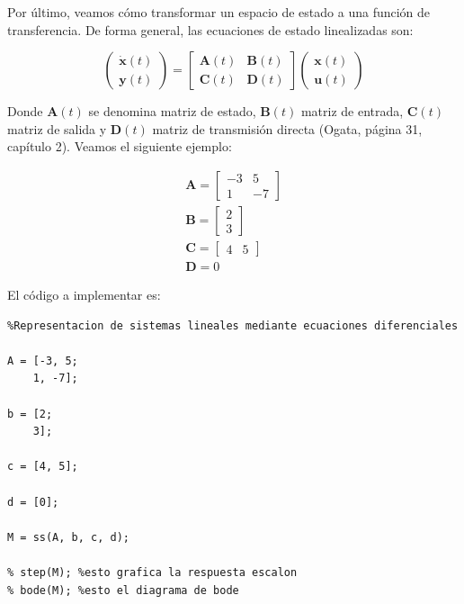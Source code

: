 Por último, veamos cómo transformar un espacio de estado a una función de transferencia. De forma general, las ecuaciones de estado linealizadas son:

\begin{equation}
    \begin{pmatrix}
        \dot{\mathbf{x}}(t) \\
        \mathbf{y}(t)
    \end{pmatrix}
    =
    \begin{bmatrix}
        \mathbf{A}(t) & \mathbf{B}(t) \\
        \mathbf{C}(t) & \mathbf{D}(t)
    \end{bmatrix}
    \begin{pmatrix}
        \mathbf{x}(t)\\
        \mathbf{u}(t)
    \end{pmatrix}
\end{equation}


Donde $\mathbf{A}(t)$ se denomina matriz de estado, $\mathbf{B}(t)$ matriz de entrada, $\mathbf{C}(t)$ matriz de salida y $\mathbf{D}(t)$ matriz de transmisión directa (Ogata, página 31, capítulo 2). Veamos el siguiente ejemplo:

\begin{gather*}
    \mathbf{A} = 
    \begin{bmatrix}
        -3 & 5 \\
        1 & -7
    \end{bmatrix} \\
    \mathbf{B} = 
    \begin{bmatrix}
        2 \\
        3
    \end{bmatrix} \\
    \mathbf{C} = 
    \begin{bmatrix}
        4 & 5
    \end{bmatrix}\\
    \mathbf{D} = 0
\end{gather*}


El código a implementar es:

\begin{lstlisting}
%Representacion de sistemas lineales mediante ecuaciones diferenciales

A = [-3, 5;
    1, -7];

b = [2;
    3];

c = [4, 5];

d = [0];

M = ss(A, b, c, d);

% step(M); %esto grafica la respuesta escalon
% bode(M); %esto el diagrama de bode
\end{lstlisting}

